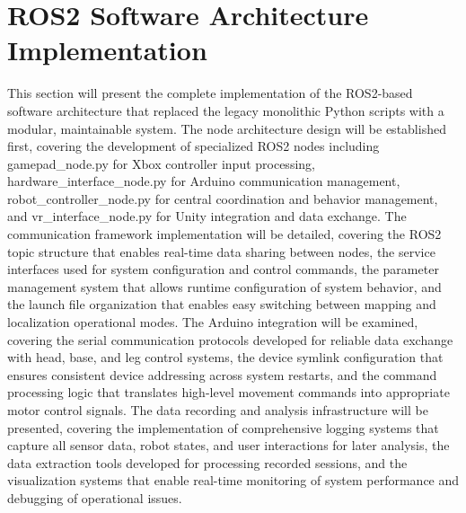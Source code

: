 \section{ROS2 Software Architecture Implementation}
This section will present the complete implementation of the ROS2-based software architecture that replaced the legacy monolithic Python scripts with a modular, maintainable system. The node architecture design will be established first, covering the development of specialized ROS2 nodes including gamepad\_node.py for Xbox controller input processing, hardware\_interface\_node.py for Arduino communication management, robot\_controller\_node.py for central coordination and behavior management, and vr\_interface\_node.py for Unity integration and data exchange. The communication framework implementation will be detailed, covering the ROS2 topic structure that enables real-time data sharing between nodes, the service interfaces used for system configuration and control commands, the parameter management system that allows runtime configuration of system behavior, and the launch file organization that enables easy switching between mapping and localization operational modes. The Arduino integration will be examined, covering the serial communication protocols developed for reliable data exchange with head, base, and leg control systems, the device symlink configuration that ensures consistent device addressing across system restarts, and the command processing logic that translates high-level movement commands into appropriate motor control signals. The data recording and analysis infrastructure will be presented, covering the implementation of comprehensive logging systems that capture all sensor data, robot states, and user interactions for later analysis, the data extraction tools developed for processing recorded sessions, and the visualization systems that enable real-time monitoring of system performance and debugging of operational issues.

